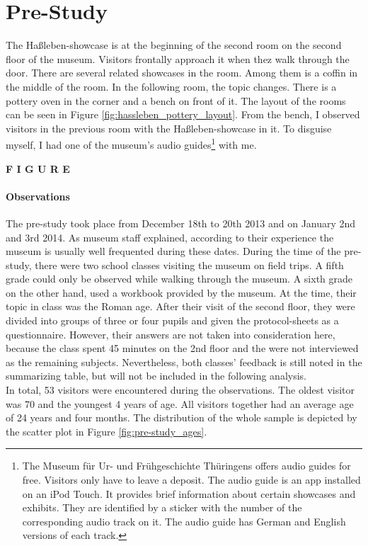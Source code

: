 
\section{Pre-Study}
\label{evaluation_pre}

The Haßleben-showcase is at the beginning of the second room on the second floor of the museum. Visitors frontally approach it when thez walk through the door. There are several related showcases in the room. Among them is a coffin in the middle of the room. In the following room, the topic changes. There is a pottery oven in the corner and a bench on front of it. The layout of the rooms can be seen in Figure \ref{fig:hassleben_pottery_layout}. From the bench, I observed visitors in the previous room with the Haßleben-showcase in it. To disguise myself, I had one of the museum's audio guides\footnote{The Museum für Ur- und Frühgeschichte Thüringens offers audio guides for free. Visitors only have to leave a deposit. The audio guide is an app installed on an iPod Touch. It provides brief information about certain showcases and exhibits. They are identified by a sticker with the number of the corresponding audio track on it. The audio guide has German and English versions of each track.} with me.  

\textbf{F I G U R E}
 
\paragraph{Observations} The pre-study took place from December 18th to 20th 2013 and on January 2nd and 3rd 2014. As museum staff explained, according to their experience the museum is usually well frequented during these dates. During the time of the pre-study, there were two school classes visiting the museum on field trips. A fifth grade could only be observed while walking through the museum. A sixth grade on the other hand, used a workbook provided by the museum. At the time, their topic in class was the Roman age. After their visit of the second floor, they were divided into groups of three or four pupils and given the protocol-sheets as a questionnaire. However, their answers are not taken into consideration here, because the class spent 45 minutes on the 2nd floor and the were not interviewed as the remaining subjects. Nevertheless, both classes' feedback is still noted in the summarizing table, but will not be included in the following analysis.
\\
In total, 53 visitors were encountered during the observations. The oldest visitor was 70 and the youngest 4 years of age. All visitors together had an average age of 24 years and four months. The distribution of the whole sample is depicted by the scatter plot in Figure \ref{fig:pre-study_ages}. 

